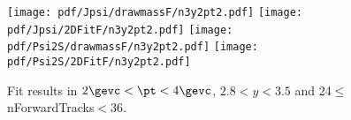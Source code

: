 \begin{figure}[H]
\begin{center}
\texttt{[image: pdf/Jpsi/drawmassF/n3y2pt2.pdf]}
\texttt{[image: pdf/Jpsi/2DFitF/n3y2pt2.pdf]}
\vspace*{-0.5cm}
\texttt{[image: pdf/Psi2S/drawmassF/n3y2pt2.pdf]}
\texttt{[image: pdf/Psi2S/2DFitF/n3y2pt2.pdf]}
\vspace*{-0.5cm}
\end{center}
\caption{Fit results in $2\gevc<\pt<4\gevc$, $2.8<y<3.5$ and 24$\leq$nForwardTracks$<$36.}
\label{Fitn3y2pt2}
\end{figure}
